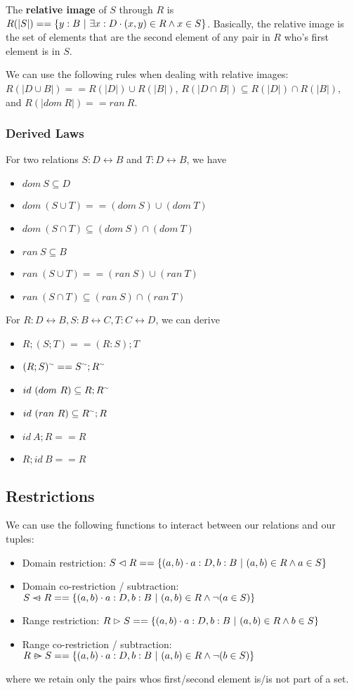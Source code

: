 \documentclass[12pt]{article}
\begin{document}
The {\bf relative image} of $S$ through $R$ is $R(|S|) == \{ y : B \ |\  \exists x : D \cdot (x,y) \in R \land x \in S \}$. Basically, the relative image is the set of elements that are the second element of any pair in $R$ who's first element is in $S$.

We can use the following rules when dealing with relative images: $R(|D \cup B|) == R(|D|) \cup R(|B|)$, $R(|D \cap B|) \subseteq R(|D|) \cap R(|B|)$, and $R(|dom\ R|) == ran\ R$.

\subsubsection*{Derived Laws}
For two relations $S : D \leftrightarrow B$ and $T : D \leftrightarrow B$, we have
\begin{itemize}
\item $dom\ S \subseteq D$
\item $dom\ (S \cup T) == (dom\ S) \cup (dom\ T)$
\item $dom\ (S \cap T) \subseteq (dom\ S) \cap (dom\ T)$
\item $ran\ S \subseteq B$
\item $ran\ (S \cup T) == (ran\ S) \cup (ran\ T)$
\item $ran\ (S \cap T) \subseteq (ran\ S) \cap (ran\ T)$
\end{itemize}

For $R : D \leftrightarrow B, S : B \leftrightarrow C, T : C \leftrightarrow D$, we can derive
\begin{itemize}
\item $R; (S; T) == (R: S); T$
\item $(R; S)^\ttilde == S^\ttilde; R^\ttilde$
\item $id\ (dom\ R) \subseteq R; R^\ttilde$
\item $id\ (ran\ R) \subseteq R^\ttilde; R$
\item $id\ A; R == R$
\item $R; id\ B == R$
\end{itemize}

\subsection*{Restrictions}
We can use the following functions to interact between our relations and our tuples:
\begin{itemize}
\item Domain restriction: $S \vartriangleleft R == \{ (a,b) \cdot a : D, b : B \ |\  (a,b) \in R \land a \in S \}$
\item Domain co-restriction / subtraction: $S \ \text{\sout{$\vartriangleleft$}}\  R == \{ (a,b) \cdot a : D, b : B \suchthat (a,b) \in R \land \neg(a \in S) \}$
\item Range restriction: $R \vartriangleright S == \{ (a,b) \cdot a : D, b : B \ |\  (a,b) \in R \land b \in S \}$
\item Range co-restriction / subtraction: $R \ \text{\sout{$\vartriangleright$}}\  S == \{ (a,b) \cdot a : D, b : B \suchthat (a,b) \in R \land \neg(b \in S) \}$
\end{itemize}
where we retain only the pairs whos first/second element is/is not part of a set.
\end{document}
